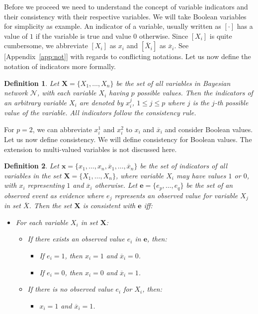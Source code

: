 \documentclass[a4paper,10pt]{article}
\theoremstyle{plain}
\newtheorem*{spn-def}{Definition}
\begin{document}
Before we proceed we need to understand the concept of variable indicators and their consistency
with their respective variables. We will take Boolean variables for simplicity as example. An
indicator of a variable, usually written as $[\cdot]$ has a value of $1$ if the variable is true
and value $0$ otherwise. Since $[X_i]$ is quite cumbersome, we abbreviate $[X_i]$ as $x_i$
and $[\overline{X}_i]$ as $\overline{x}_i$. See [Appendix~\ref{app:not}] with regards to
conflicting notations. Let us now define the notation of indicators more formally.

\begin{spn-def}
  Let $\mathbf{X}=\{X_1,\ldots,X_n\}$ be the set of all variables in Bayesian network
  $\mathcal{N}$, with each variable $X_i$ having $p$ possible values. Then the indicators of
  an arbitrary variable $X_i$ are denoted by $x_i^j$, $1\leq j \leq p$ where $j$ is the $j$-th
  possible value of the variable. All indicators follow the consistency rule.
\end{spn-def}

For $p=2$, we can abbreviate $x_i^1$ and $x_i^2$ to $x_i$ and $\overline{x}_i$ and consider
Boolean values. Let us now define consistency. We will define consistency for Boolean values. The
extension to multi-valued variables is not discussed here.

\begin{spn-def}
  Let $\mathbf{x}=\{x_1,\ldots,x_n,\overline{x}_1,\ldots,\overline{x}_n\}$ be the set of indicators
  of all variables in the set $\mathbf{X}=\{X_1,\ldots,X_n\}$, where variable $X_i$ may have values
  $1$ or $0$, with $x_i$ representing $1$ and $\overline{x}_i$ otherwise. Let $\mathbf{e}=\{e_p,
  \ldots,e_q\}$ be the set of an observed event as evidence where $e_j$ represents an observed
  value for variable $X_j$ in set $\overline{X}$. Then the set $\mathbf{X}$ is consistent with
  $\mathbf{e}$ iff:

  \begin{itemize}
    \item For each variable $X_i$ in set $\mathbf{X}$:
      \begin{itemize}
        \item If there exists an observed value $e_i$ in $\mathbf{e}$, then:
        \begin{itemize}
          \item If $e_i=1$, then $x_i=1$ and $\overline{x}_i=0$.
          \item If $e_i=0$, then $x_i=0$ and $\overline{x}_i=1$.
        \end{itemize}
        \item If there is no observed value $e_i$ for $X_i$, then:
        \begin{itemize}
          \item $x_i=1$ and $\overline{x}_i=1$.
        \end{itemize}
      \end{itemize}
  \end{itemize}
\end{spn-def}
\end{document}
